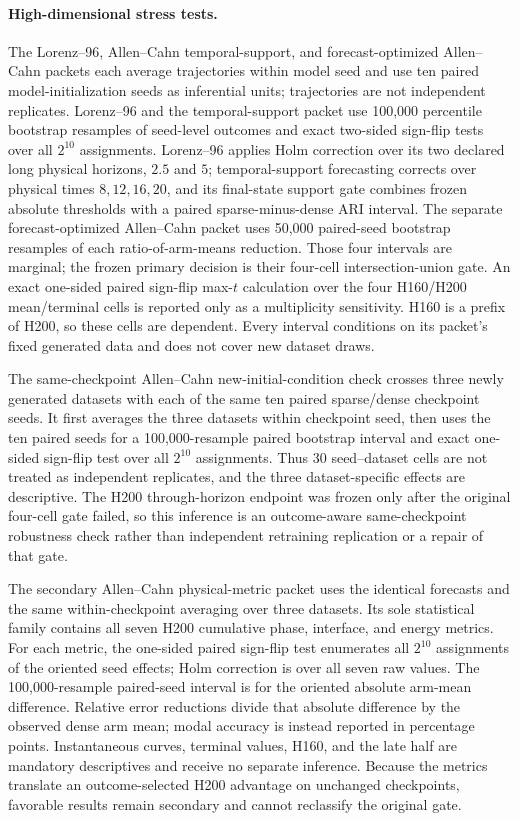 \paragraph{High-dimensional stress tests.}
The Lorenz--96, Allen--Cahn temporal-support, and forecast-optimized
Allen--Cahn packets each average trajectories within model seed and use ten
paired model-initialization seeds as inferential units; trajectories are not
independent replicates. Lorenz--96 and the temporal-support packet use
100,000 percentile bootstrap resamples of seed-level outcomes and exact
two-sided sign-flip tests over all \(2^{10}\) assignments. Lorenz--96 applies
Holm correction over its two declared long physical horizons, \(2.5\) and
\(5\); temporal-support forecasting corrects over physical times
\(8,12,16,20\), and its final-state support gate combines frozen absolute
thresholds with a paired sparse-minus-dense ARI interval. The separate
forecast-optimized Allen--Cahn packet uses 50,000 paired-seed bootstrap
resamples of each ratio-of-arm-means reduction. Those four intervals are
marginal; the frozen primary decision is their four-cell intersection-union
gate. An exact one-sided paired sign-flip max-\(t\) calculation over the four
H160/H200 mean/terminal cells is reported only as a multiplicity sensitivity.
H160 is a prefix of H200, so these cells are dependent. Every interval
conditions on its packet's fixed generated data and does not cover new dataset
draws.

The same-checkpoint Allen--Cahn new-initial-condition check crosses three newly
generated datasets with each of the same ten paired sparse/dense checkpoint
seeds. It first averages the three datasets within checkpoint seed, then uses
the ten paired seeds for a 100,000-resample paired bootstrap interval and exact
one-sided sign-flip test over all $2^{10}$ assignments. Thus 30 seed--dataset
cells are not treated as independent replicates, and the three dataset-specific
effects are descriptive. The H200 through-horizon endpoint was frozen only
after the original four-cell gate failed, so this inference is an outcome-aware
same-checkpoint robustness check rather than independent retraining replication
or a repair of that gate.

The secondary Allen--Cahn physical-metric packet uses the identical forecasts
and the same within-checkpoint averaging over three datasets. Its sole
statistical family contains all seven H200 cumulative phase, interface, and
energy metrics. For each metric, the one-sided paired sign-flip test enumerates
all $2^{10}$ assignments of the oriented seed effects; Holm correction is over
all seven raw values. The 100,000-resample paired-seed interval is for the
oriented absolute arm-mean difference. Relative error reductions divide that
absolute difference by the observed dense arm mean; modal accuracy is instead
reported in percentage points. Instantaneous curves, terminal values, H160,
and the late half are mandatory descriptives and receive no separate
inference. Because the metrics translate an outcome-selected H200 advantage
on unchanged checkpoints, favorable results remain secondary and cannot
reclassify the original gate.

